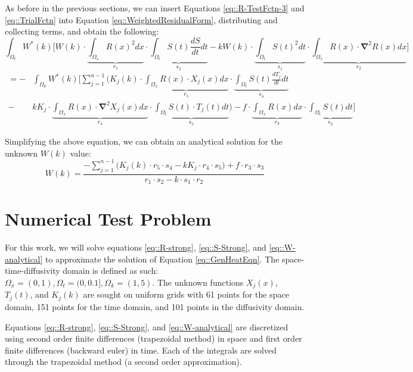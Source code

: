 \documentclass{article}
\def\ds{\displaystyle}
\def\grad{\mathbf\nabla}
\begin{document}
As before in the previous sections, we can insert Equations \ref{eq::R-TestFctn-3} and \ref{eq::TrialFctn} into Equation \ref{eq::WeightedResidualForm}, distributing and collecting terms, and obtain the following:
\begin{equation*}
\ds\int_{\Omega_t} W^*(k) \bigg[W(k) \cdot \underbrace{\ds\int_{\Omega_x} R(x)^2 dx}_{r_1} \cdot \underbrace{\ds\int_{\Omega_t} S(t)\frac{dS}{dt} dt}_{s_2} - kW(k) \cdot \underbrace{\ds\int_{\Omega_t} S(t)^2 dt}_{s_1} \cdot \underbrace{\ds\int_{\Omega_x} R(x)\cdot \grad^2R(x) dx}_{r_2} \bigg]
\end{equation*}\vspace{-15pt}
\begin{align}
=  -& \ds\int_{\Omega_k} W^*(k) \Bigg[\ds\sum_{j=1}^{n-1} \bigg( K_j(k) \cdot \underbrace{\ds\int_{\Omega_x} R(x)\cdot X_j(x) dx}_{r_5} \cdot \underbrace{\ds\int_{\Omega_t} S(t) \frac{dT_j}{dt} dt}_{s_4} \nonumber\\
- &k K_j  \cdot \underbrace{\ds\int_{\Omega_x} R(x)\cdot \grad^2 X_j(x)dx}_{r_4} \cdot \underbrace{\ds\int_{\Omega_t} S(t)\cdot T_j(t)dt}_{s_5}\bigg) - f\cdot \underbrace{\ds\int_{\Omega_x} R(x) dx }_{r_3} \cdot \underbrace{\ds\int_{\Omega_t}S(t)dt}_{s_3} \Bigg]
\end{align}

Simplifying the above equation, we can obtain an analytical solution for the unknown $W(k)$ value:
\begin{equation}
\label{eq::W-analytical}
W(k) =  \frac{-\ds\sum_{j=1}^{n-1} \bigg( K_j(k) \cdot r_5 \cdot s_4 -  k K_j \cdot r_4 \cdot s_5\bigg) + f\cdot r_3 \cdot s_3}{r_1 \cdot s_2 - k \cdot s_1 \cdot r_2}
\end{equation}

\section{Numerical Test Problem}
For this work, we will solve equations \ref{eq::R-strong}, \ref{eq::S-Strong}, and \ref{eq::W-analytical} to approximate the solution of Equation \ref{eq::GenHeatEqn}. The space-time-diffusivity domain is defined as such: $\Omega_x = (0,1), \Omega_t = (0,0.1], \Omega_k = (1,5)$. The unknown functions $X_j(x)$, $T_j(t)$, and $K_j(k)$ are sought on uniform grids with 61 points for the space domain, 151 points for the time domain, and 101 points in the diffusivity domain.

Equations \ref{eq::R-strong}, \ref{eq::S-Strong}, and \ref{eq::W-analytical} are discretized using second order finite differences (trapezoidal method) in space and first order finite differences  (backward euler) in time. Each of the integrals are solved through the trapezoidal method (a second order approximation).
\end{document}
